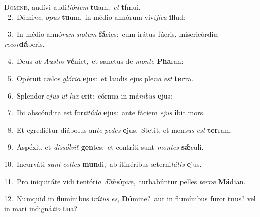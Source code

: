 \lettrine{\initial\textcolor{\initialcolor}{D}}{ómine,} audívi audi\-\textit{ti}\-\textit{ó}\textit{nem} \textbf{tu}\-am,~\star \textit{et} \textbf{tí}\-mui.\\
{\numbfont\textcolor{\numbcolor}{~2.}}~Dómi\-\textit{ne}\-, \textit{o}\-\textit{pus} \textbf{tu}\-um,~\star in médio annórum viví\-\textit{fi}\-\textit{ca} \textbf{il}\-lud:\par
{\numbfont\textcolor{\numbcolor}{~3.}}~In médio annó\textit{rum} \textit{no}\-\textit{tum} \textbf{fá}\-cies:~\star cum irátus fúeris, misericórdiæ \textit{re}\-\textit{cor}\textbf{dá}beris.\par
{\numbfont\textcolor{\numbcolor}{~4.}}~Deus \textit{ab} \textit{Aus}\-\textit{tro} \textbf{vé}\-niet,~\star et sanctus de \textit{mon}\-\textit{te} \textbf{Pha}\-ran:\par
{\numbfont\textcolor{\numbcolor}{~5.}}~Opéruit cælos \textit{gló}\-\textit{ri}\textit{a} \textbf{e}\-jus:~\star et laudis ejus ple\textit{na} \textit{est} \textbf{ter}\-ra.\par
{\numbfont\textcolor{\numbcolor}{~6.}}~Splendor e\textit{jus} \textit{ut} \textit{lux} \textbf{e}\-rit:~\star córnua in má\-\textit{ni}\-\textit{bus} \textbf{e}\-jus:\par
{\numbfont\textcolor{\numbcolor}{~7.}}~Ibi abscóndita est for\-\textit{ti}\-\textit{tú}\textit{do} \textbf{e}\-jus:~\star ante fáciem \textit{e}\-\textit{jus} \textbf{i}\-bit mors.\par
{\numbfont\textcolor{\numbcolor}{~8.}}~Et egrediétur diábolus an\textit{te} \textit{pe}\-\textit{des} \textbf{e}\-jus.~\star Stetit, et men\textit{sus} \textit{est} \textbf{ter}\-ram.\par
{\numbfont\textcolor{\numbcolor}{~9.}}~Aspéxit, et \textit{dis}\-\textit{sól}\textit{vit} \textbf{gen}\-tes:~\star et contríti sunt \textit{mon}\-\textit{tes} \textbf{sǽ}\-culi.\par
{\numbfont\textcolor{\numbcolor}{10.}}~Incurváti \textit{sunt} \textit{col}\-\textit{les} \textbf{mun}\-di,~\star ab itinéribus æterni\-\textit{tá}\-\textit{tis} \textbf{e}\-jus.\par
{\numbfont\textcolor{\numbcolor}{11.}}~Pro iniquitáte vidi tentóri\textit{a} \textit{Æ}\-\textit{thi}\textbf{ó}piæ,~\star turbabúntur pelles \textit{ter}\-\textit{ræ} \textbf{Má}\-dian.\par
{\numbfont\textcolor{\numbcolor}{12.}}~Numquid in flumínibus i\-\textit{rá}\-\textit{tus} \textit{es}\-, \textbf{Dó}\-mine?~\star aut in flumínibus furor tuus? vel in mari indigná\-\textit{ti}\-\textit{o} \textbf{tu}\-a?\par
